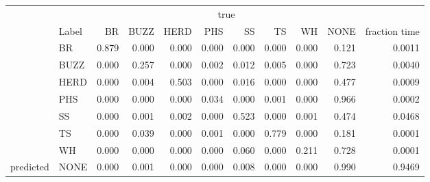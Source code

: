 
\begin{tabular}[t]{llrrrrrrrrr}
\toprule
\multicolumn{2}{c}{ } & \multicolumn{8}{c}{true} & \multicolumn{1}{c}{ } \\
\cmidrule(l{3pt}r{3pt}){3-10}
  & Label & BR & BUZZ & HERD & PHS & SS & TS & WH & NONE & fraction time\\
\midrule
 & BR & 0.879 & 0.000 & 0.000 & 0.000 & 0.000 & 0.000 & 0.000 & 0.121 & 0.0011\\

 & BUZZ & 0.000 & 0.257 & 0.000 & 0.002 & 0.012 & 0.005 & 0.000 & 0.723 & 0.0040\\

 & HERD & 0.000 & 0.004 & 0.503 & 0.000 & 0.016 & 0.000 & 0.000 & 0.477 & 0.0009\\

 & PHS & 0.000 & 0.000 & 0.000 & 0.034 & 0.000 & 0.001 & 0.000 & 0.966 & 0.0002\\

 & SS & 0.000 & 0.001 & 0.002 & 0.000 & 0.523 & 0.000 & 0.001 & 0.474 & 0.0468\\

 & TS & 0.000 & 0.039 & 0.000 & 0.001 & 0.000 & 0.779 & 0.000 & 0.181 & 0.0001\\

 & WH & 0.000 & 0.000 & 0.000 & 0.000 & 0.060 & 0.000 & 0.211 & 0.728 & 0.0001\\

\multirow{-8}{*}{\raggedright\arraybackslash predicted} & NONE & 0.000 & 0.001 & 0.000 & 0.000 & 0.008 & 0.000 & 0.000 & 0.990 & 0.9469\\
\bottomrule
\end{tabular}

